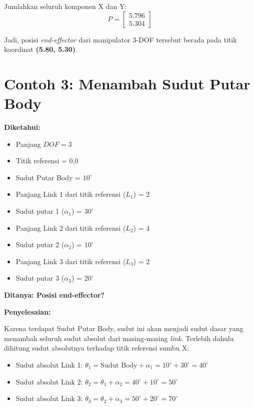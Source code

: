 \documentclass[12pt, a4paper, bahasa]{article}
\begin{document}
Jumlahkan seluruh komponen X dan Y:
\begin{equation}
P = \begin{bmatrix} 
5.796 \\ 
5.304 
\end{bmatrix}
\end{equation}

Jadi, posisi \textit{end-effector} dari manipulator 3-DOF tersebut berada pada titik koordinat \textbf{(5.80, 5.30)}.

\section*{Contoh 3: Menambah Sudut Putar Body}
\textbf{Diketahui:}
\begin{itemize}
    \item Panjang $DOF = 3$
    \item Titik referensi = 0,0
    \item Sudut Putar Body = $10^\circ$
    \item Panjang Link 1 dari titik referensi ($L_1$) = 2
    \item Sudut putar 1 ($\alpha_1$) = $30^\circ$
    \item Panjang Link 2 dari titik referensi ($L_2$) = 4
    \item Sudut putar 2 ($\alpha_2$) = $10^\circ$
    \item Panjang Link 3 dari titik referensi ($L_3$) = 2
    \item Sudut putar 3 ($\alpha_3$) = $20^\circ$
\end{itemize}

\noindent \textbf{Ditanya: Posisi end-effector?}
\vspace{0.5cm}

\noindent \textbf{Penyelesaian:}

Karena terdapat Sudut Putar Body, sudut ini akan menjadi sudut dasar yang menambah seluruh sudut absolut dari masing-masing \textit{link}. Terlebih dahulu dihitung sudut absolutnya terhadap titik referensi sumbu X:
\begin{itemize}
    \item Sudut absolut Link 1: $\theta_1 = \text{Sudut Body} + \alpha_1 = 10^\circ + 30^\circ = 40^\circ$
    \item Sudut absolut Link 2: $\theta_2 = \theta_1 + \alpha_2 = 40^\circ + 10^\circ = 50^\circ$
    \item Sudut absolut Link 3: $\theta_3 = \theta_2 + \alpha_3 = 50^\circ + 20^\circ = 70^\circ$
\end{itemize}
\end{document}
